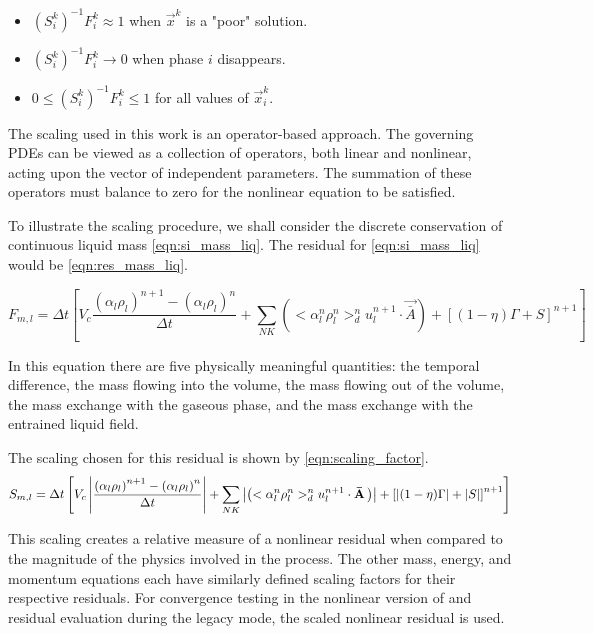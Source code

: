 \begin{itemize}
\item{$(S_{i}^{k})^{-1} F^{k}_i \approx 1$ when $\vec{x}^{k}$ is a "poor" solution.}
\item{$(S_{i}^{k})^{-1} F^{k}_i \rightarrow 0$ when phase $i$ disappears.}
\item{$0 \leq (S_{i}^{k})^{-1} F^{k}_{i} \leq 1 $ for all values of $\vec{x}^{k}_i$.}
\end{itemize}

The scaling used in this work is an operator-based approach.
The governing PDEs can be viewed as a collection of operators, both linear and nonlinear, acting upon the vector of independent parameters.
The summation of these operators must balance to zero for the nonlinear equation to be satisfied.

To illustrate the scaling procedure, we shall consider the discrete conservation of continuous liquid mass \eqref{eqn:si_mass_liq}.
The residual for \eqref{eqn:si_mass_liq} would be \eqref{eqn:res_mass_liq}.

\begin{equation}
\label{eqn:res_mass_liq}
F_{m,l} = \Delta t \left[ V_c \frac{\left(\alpha_l \rho_l \right)^{n+1} - \left(\alpha_l \rho_l \right)^{n}}{\Delta t} + \sum_{NK}\left( <\alpha^n_l \rho^n_l>^{n}_{d} u^{n+1}_l  \cdot \vec{\bar{A}}\right) + \left[(1-\eta)\Gamma + S \right]^{n+1}\right]
\end{equation}

In this equation there are five physically meaningful quantities: the temporal difference, the mass flowing into  the volume, the mass flowing out of the volume, the mass exchange with the gaseous phase, and the mass exchange with the entrained liquid field.

The scaling chosen for this residual is shown by \eqref{eqn:scaling_factor}.
\begin{equation}
\label{eqn:scaling_factor}
S_{m,l} = \Delta t \left[ V_c \abs{\frac{\left(\alpha_l \rho_l \right)^{n+1} - \left(\alpha_l \rho_l \right)^{n}}{\Delta t}} + \sum_{NK}\abs{\left( <\alpha^n_l \rho^n_l>^{n}_{d} u^{n+1}_l  \cdot \vec{\bar{A}}\right)} + \left[\abs{(1-\eta)\Gamma} + \abs{S} \right]^{n+1}\right]
\end{equation}

This scaling creates a relative measure of a nonlinear residual when compared to the magnitude of the physics involved in the process.
The other mass, energy, and momentum equations each have similarly defined scaling factors for their respective residuals.
For convergence testing in the nonlinear version of \cobra{} and residual evaluation during the legacy mode, the scaled nonlinear residual is used.

